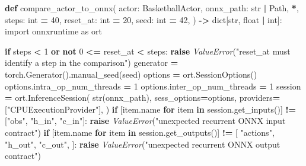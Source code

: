 \documentclass[
  chinese,
  11pt,
  letterpaper,
]{article}
\newenvironment{Shaded}{\begin{snugshade}}{\end{snugshade}}
\newcommand{\BuiltInTok}[1]{#1}
\newcommand{\ControlFlowTok}[1]{\textcolor[rgb]{0.13,0.29,0.53}{\textbf{#1}}}
\newcommand{\DecValTok}[1]{\textcolor[rgb]{0.00,0.00,0.81}{#1}}
\newcommand{\ImportTok}[1]{#1}
\newcommand{\KeywordTok}[1]{\textcolor[rgb]{0.13,0.29,0.53}{\textbf{#1}}}
\newcommand{\NormalTok}[1]{#1}
\newcommand{\OperatorTok}[1]{\textcolor[rgb]{0.81,0.36,0.00}{\textbf{#1}}}
\newcommand{\PreprocessorTok}[1]{\textcolor[rgb]{0.56,0.35,0.01}{\textit{#1}}}
\newcommand{\StringTok}[1]{\textcolor[rgb]{0.31,0.60,0.02}{#1}}
\renewenvironment{Shaded}{\par\smallskip}{\par\smallskip}
\begin{document}
\begin{Shaded}
\begin{Highlighting}[]
\KeywordTok{def}\NormalTok{ compare\_actor\_to\_onnx(}
\NormalTok{    actor: BasketballActor,}
\NormalTok{    onnx\_path: }\BuiltInTok{str} \OperatorTok{|}\NormalTok{ Path,}
    \OperatorTok{*}\NormalTok{,}
\NormalTok{    steps: }\BuiltInTok{int} \OperatorTok{=} \DecValTok{40}\NormalTok{,}
\NormalTok{    reset\_at: }\BuiltInTok{int} \OperatorTok{=} \DecValTok{20}\NormalTok{,}
\NormalTok{    seed: }\BuiltInTok{int} \OperatorTok{=} \DecValTok{42}\NormalTok{,}
\NormalTok{) }\OperatorTok{{-}\textgreater{}} \BuiltInTok{dict}\NormalTok{[}\BuiltInTok{str}\NormalTok{, }\BuiltInTok{float} \OperatorTok{|} \BuiltInTok{int}\NormalTok{]:}
    \ImportTok{import}\NormalTok{ onnxruntime }\ImportTok{as}\NormalTok{ ort}

    \ControlFlowTok{if}\NormalTok{ steps }\OperatorTok{\textless{}} \DecValTok{1} \KeywordTok{or} \KeywordTok{not} \DecValTok{0} \OperatorTok{\textless{}=}\NormalTok{ reset\_at }\OperatorTok{\textless{}}\NormalTok{ steps:}
        \ControlFlowTok{raise} \PreprocessorTok{ValueError}\NormalTok{(}\StringTok{"reset\_at must identify a step in the comparison"}\NormalTok{)}
\NormalTok{    generator }\OperatorTok{=}\NormalTok{ torch.Generator().manual\_seed(seed)}
\NormalTok{    options }\OperatorTok{=}\NormalTok{ ort.SessionOptions()}
\NormalTok{    options.intra\_op\_num\_threads }\OperatorTok{=} \DecValTok{1}
\NormalTok{    options.inter\_op\_num\_threads }\OperatorTok{=} \DecValTok{1}
\NormalTok{    session }\OperatorTok{=}\NormalTok{ ort.InferenceSession(}
        \BuiltInTok{str}\NormalTok{(onnx\_path),}
\NormalTok{        sess\_options}\OperatorTok{=}\NormalTok{options,}
\NormalTok{        providers}\OperatorTok{=}\NormalTok{[}\StringTok{"CPUExecutionProvider"}\NormalTok{],}
\NormalTok{    )}
    \ControlFlowTok{if}\NormalTok{ [item.name }\ControlFlowTok{for}\NormalTok{ item }\KeywordTok{in}\NormalTok{ session.get\_inputs()] }\OperatorTok{!=}\NormalTok{ [}\StringTok{"obs"}\NormalTok{, }\StringTok{"h\_in"}\NormalTok{, }\StringTok{"c\_in"}\NormalTok{]:}
        \ControlFlowTok{raise} \PreprocessorTok{ValueError}\NormalTok{(}\StringTok{"unexpected recurrent ONNX input contract"}\NormalTok{)}
    \ControlFlowTok{if}\NormalTok{ [item.name }\ControlFlowTok{for}\NormalTok{ item }\KeywordTok{in}\NormalTok{ session.get\_outputs()] }\OperatorTok{!=}\NormalTok{ [}
        \StringTok{"actions"}\NormalTok{,}
        \StringTok{"h\_out"}\NormalTok{,}
        \StringTok{"c\_out"}\NormalTok{,}
\NormalTok{    ]:}
        \ControlFlowTok{raise} \PreprocessorTok{ValueError}\NormalTok{(}\StringTok{"unexpected recurrent ONNX output contract"}\NormalTok{)}

\end{Highlighting}
\end{Shaded}
\end{document}
